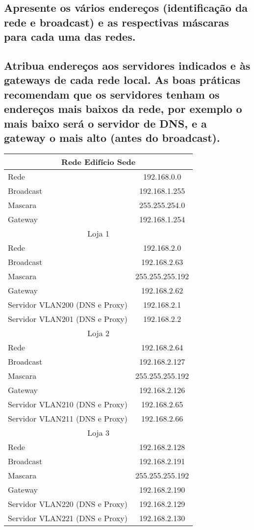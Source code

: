 \documentclass[a4paper,12pt]{article}
\begin{document}
\subsection{Apresente os vários endereços (identificação da rede e broadcast) e as
respectivas máscaras para cada uma das redes.}
\subsection{Atribua endereços aos servidores indicados e às gateways de cada rede local.
As boas práticas recomendam que os servidores tenham os endereços mais
baixos da rede, por exemplo o mais baixo será o servidor de DNS, e a gateway
o mais alto (antes do broadcast).}

\begin{table}[ht]
   \centering
   \begin{tabular}{ l | c }
      \toprule
      \multicolumn{2}{c}{Rede Edifício Sede} \\\hline 
      Rede & 192.168.0.0 \\\hline 
      Broadcast & 192.168.1.255 \\\hline 
      Mascara & 255.255.254.0 \\\hline
      Gateway & 192.168.1.254 \\\hline

      \multicolumn{2}{c}{Loja 1} \\\hline 
      Rede & 192.168.2.0 \\\hline 
      Broadcast & 192.168.2.63 \\\hline 
      Mascara & 255.255.255.192 \\\hline
      Gateway & 192.168.2.62 \\\hline
      Servidor VLAN200 (DNS e Proxy) & 192.168.2.1 \\\hline
      Servidor VLAN201 (DNS e Proxy) & 192.168.2.2 \\\hline
      \multicolumn{2}{c}{Loja 2} \\\hline 
      Rede & 192.168.2.64 \\\hline 
      Broadcast & 192.168.2.127 \\\hline 
      Mascara & 255.255.255.192 \\\hline
      Gateway & 192.168.2.126 \\\hline
      Servidor VLAN210 (DNS e Proxy) & 192.168.2.65 \\\hline
      Servidor VLAN211 (DNS e Proxy) & 192.168.2.66 \\\hline
      \multicolumn{2}{c}{Loja 3} \\\hline 
      Rede & 192.168.2.128 \\\hline 
      Broadcast & 192.168.2.191 \\\hline 
      Mascara & 255.255.255.192 \\\hline
      Gateway & 192.168.2.190 \\\hline
      Servidor VLAN220 (DNS e Proxy) & 192.168.2.129 \\\hline
      Servidor VLAN221 (DNS e Proxy) & 192.168.2.130 \\\hline


\end{tabular}
\end{table}
\end{document}
